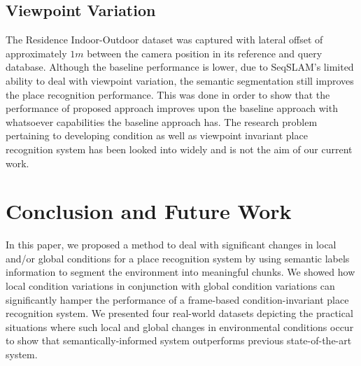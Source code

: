 \documentclass[letterpaper, 10 pt, conference]{ieeeconf}  %
\begin{document}
\subsection{Viewpoint Variation}
The Residence Indoor-Outdoor dataset was captured with lateral offset of approximately $1 m$ between the camera position in its reference and query database. Although the baseline performance is lower, due to SeqSLAM's limited ability to deal with viewpoint variation, the semantic segmentation still improves the place recognition performance. This was done in order to show that the performance of proposed approach improves upon the baseline approach with whatsoever capabilities the baseline approach has. The research problem pertaining to developing condition as well as viewpoint invariant place recognition system has been looked into widely \cite{milford2015sequence,chen2017deep} and is not the aim of our current work.

\section{Conclusion and Future Work}
In this paper, we proposed a method to deal with significant changes in local and/or global conditions for a place recognition system by using semantic labels information to segment the environment into meaningful chunks. We showed how local condition variations in conjunction with global condition variations can significantly hamper the performance of a frame-based condition-invariant place recognition system. We presented four real-world datasets depicting the practical situations where such local and global changes in environmental conditions occur to show that semantically-informed system outperforms previous state-of-the-art system.
\end{document}

